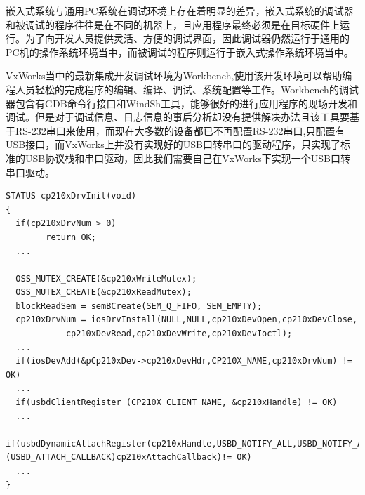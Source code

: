 	
	
	
	
	
	
	
	
	
	
	
	
	
	
	
	
	
	
	嵌入式系统与通用PC系统在调试环境上存在着明显的差异，嵌入式系统的调试器和被调试的程序往往是在不同的机器上，且应用程序最终必须是在目标硬件上运行。为了向开发人员提供灵活、方便的调试界面，因此调试器仍然运行于通用的PC机的操作系统环境当中，而被调试的程序则运行于嵌入式操作系统环境当中。
	
	VxWorks当中的最新集成开发调试环境为Workbench,使用该开发环境可以帮助编程人员轻松的完成程序的编辑、编译、调试、系统配置等工作\cite{嵌入式实时操作系统VxWorks及其开发环境Tornado}\cite{Tronado}。Workbench的调试器包含有GDB命令行接口和WindSh工具，能够很好的进行应用程序的现场开发和调试。但是对于调试信息、日志信息的事后分析却没有提供解决办法且该工具要基于RS-232串口来使用，而现在大多数的设备都已不再配置RS-232串口,只配置有USB接口，而VxWorks上并没有实现好的USB口转串口的驱动程序，只实现了标准的USB协议栈和串口驱动，因此我们需要自己在VxWorks下实现一个USB口转串口驱动。













\lstset{language=C}
\begin{lstlisting}
STATUS cp210xDrvInit(void)
{ 	
  if(cp210xDrvNum > 0)
		return OK;
  ...
  	
  OSS_MUTEX_CREATE(&cp210xWriteMutex);
  OSS_MUTEX_CREATE(&cp210xReadMutex);
  blockReadSem = semBCreate(SEM_Q_FIFO, SEM_EMPTY);	
  cp210xDrvNum = iosDrvInstall(NULL,NULL,cp210xDevOpen,cp210xDevClose,
			cp210xDevRead,cp210xDevWrite,cp210xDevIoctl);
  ...
  if(iosDevAdd(&pCp210xDev->cp210xDevHdr,CP210X_NAME,cp210xDrvNum) != OK)
  ...  
  if(usbdClientRegister (CP210X_CLIENT_NAME, &cp210xHandle) != OK)
  ...  
  if(usbdDynamicAttachRegister(cp210xHandle,USBD_NOTIFY_ALL,USBD_NOTIFY_ALL,USBD_NOTIFY_ALL,TRUE,(USBD_ATTACH_CALLBACK)cp210xAttachCallback)!= OK)
  ...
}
\end{lstlisting}\\






